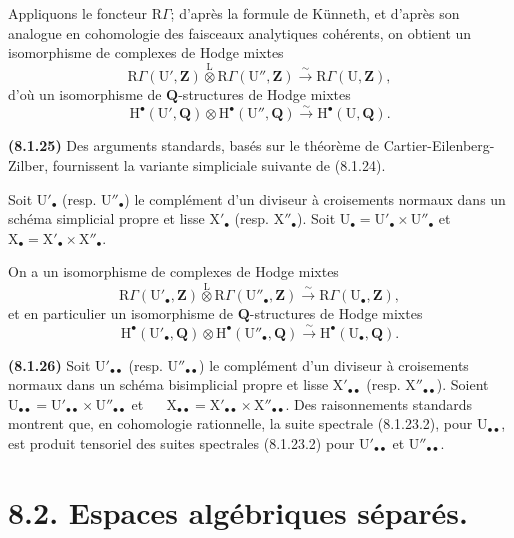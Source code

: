 \documentclass[11pt,leqno]{article}
\newcommand{\Page}[1]{\ifvmode\noindent\else\unskip\ \fi{\footnotesize\textcolor{gray}{[p.\,#1]}}\ \ignorespaces}
\begin{document}
Appliquons le foncteur \(\mathrm{R}\Gamma\); d’après la formule de Künneth, et d’après son analogue en cohomologie des faisceaux analytiques cohérents, on obtient un isomorphisme de complexes de Hodge mixtes
\[
\mathrm{R}\Gamma(\mathrm{U}',\mathbf{Z})
\overset{\mathrm{L}}{\otimes}
\mathrm{R}\Gamma(\mathrm{U}'',\mathbf{Z})
\xrightarrow{\sim}
\mathrm{R}\Gamma(\mathrm{U},\mathbf{Z}),
\]
d’où un isomorphisme de \(\mathbf{Q}\)-structures de Hodge mixtes
\[
\mathrm{H}^\bullet(\mathrm{U}',\mathbf{Q})
\otimes\mathrm{H}^\bullet(\mathrm{U}'',\mathbf{Q})
\xrightarrow{\sim}\mathrm{H}^\bullet(\mathrm{U},\mathbf{Q}).
\]

\textbf{(8.1.25)} Des arguments standards, basés sur le théorème de Cartier-Eilenberg-Zilber, fournissent la variante simpliciale suivante de (8.1.24).

Soit \(\mathrm{U}'_\bullet\) (resp. \(\mathrm{U}''_\bullet\)) le complément d’un diviseur à croisements normaux dans un schéma simplicial propre et lisse \(\mathrm{X}'_\bullet\) (resp. \(\mathrm{X}''_\bullet\)). Soit \(\mathrm{U}_\bullet=\mathrm{U}'_\bullet\times\mathrm{U}''_\bullet\) et \(\mathrm{X}_\bullet=\mathrm{X}'_\bullet\times\mathrm{X}''_\bullet\).

On a un isomorphisme de complexes de Hodge mixtes
\[
\mathrm{R}\Gamma(\mathrm{U}'_\bullet,\mathbf{Z})
\overset{\mathrm{L}}{\otimes}
\mathrm{R}\Gamma(\mathrm{U}''_\bullet,\mathbf{Z})
\xrightarrow{\sim}
\mathrm{R}\Gamma(\mathrm{U}_\bullet,\mathbf{Z}),
\]
et en particulier un isomorphisme de \(\mathbf{Q}\)-structures de Hodge mixtes
\[
\mathrm{H}^\bullet(\mathrm{U}'_\bullet,\mathbf{Q})
\otimes\mathrm{H}^\bullet(\mathrm{U}''_\bullet,\mathbf{Q})
\xrightarrow{\sim}\mathrm{H}^\bullet(\mathrm{U}_\bullet,\mathbf{Q}).
\]

\textbf{(8.1.26)} Soit \(\mathrm{U}'_{\bullet\bullet}\) (resp. \(\mathrm{U}''_{\bullet\bullet}\)) le complément d’un diviseur à croisements normaux dans un schéma bisimplicial propre et lisse \(\mathrm{X}'_{\bullet\bullet}\) (resp. \(\mathrm{X}''_{\bullet\bullet}\)). Soient \(\mathrm{U}_{\bullet\bullet}=\mathrm{U}'_{\bullet\bullet}\times\mathrm{U}''_{\bullet\bullet}\) et
\Page{38}
\(\mathrm{X}_{\bullet\bullet}=\mathrm{X}'_{\bullet\bullet}\times\mathrm{X}''_{\bullet\bullet}\). Des raisonnements standards montrent que, en cohomologie rationnelle, la suite spectrale (8.1.23.2), pour \(\mathrm{U}_{\bullet\bullet}\), est produit tensoriel des suites spectrales (8.1.23.2) pour \(\mathrm{U}'_{\bullet\bullet}\) et \(\mathrm{U}''_{\bullet\bullet}\).

\section*{8.2. Espaces algébriques séparés.}
\end{document}
